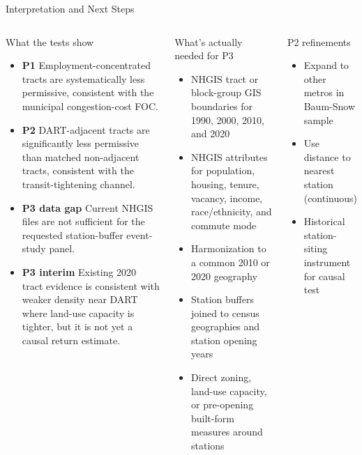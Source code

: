 \documentclass[10pt]{beamer}
\begin{document}
\begin{frame}[shrink=15]{Interpretation and Next Steps}

\begin{columns}[T]
\begin{block}{What the tests show}
\begin{itemize}\small
  \item \textbf{P1 \checkmark} Employment-concentrated tracts are systematically less permissive, consistent with the municipal congestion-cost FOC.
  \item \textbf{P2 \checkmark} DART-adjacent tracts are significantly less permissive than matched non-adjacent tracts, consistent with the transit-tightening channel.
  \item \textbf{P3 data gap} Current NHGIS files are not sufficient for the requested station-buffer event-study panel.
  \item \textbf{P3 interim} Existing 2020 tract evidence is consistent with weaker density near DART where land-use capacity is tighter, but it is not yet a causal return estimate.
\end{itemize}
\end{block}

\begin{alertblock}{What's actually needed for P3}
\begin{itemize}\small
  \item NHGIS tract or block-group GIS boundaries for 1990, 2000, 2010, and 2020
  \item NHGIS attributes for population, housing, tenure, vacancy, income, race/ethnicity, and commute mode
  \item Harmonization to a common 2010 or 2020 geography
  \item Station buffers joined to census geographies and station opening years
  \item Direct zoning, land-use capacity, or pre-opening built-form measures around stations
\end{itemize}
\end{alertblock}

\vspace{0.2cm}
\begin{block}{P2 refinements}
\begin{itemize}\small
  \item Expand to other metros in Baum-Snow sample
  \item Use distance to nearest station (continuous)
  \item Historical station-siting instrument for causal test
\end{itemize}
\end{block}
\end{columns}

\end{frame}
\end{document}
